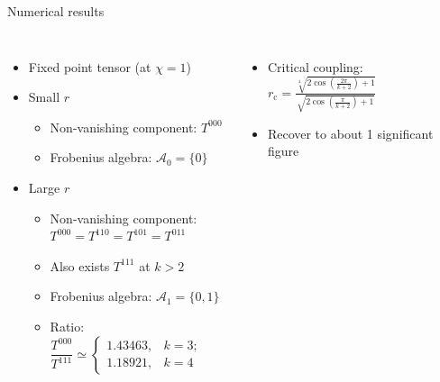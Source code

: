 \documentclass{fdubeamer}
\begin{document}
\begin{frame}{Numerical results}

\begin{columns}[T]


    \begin{itemize}
      \item Fixed point tensor (at $\chi=1$)
      \item Small $r$

        \begin{itemize}
          \item Non-vanishing component: $T^{000}$
          \item Frobenius algebra: $\mathcal{A}_0=\{0\}$
        \end{itemize}

      \item Large $r$

        \begin{itemize}
          \item Non-vanishing component: \\
            \mbox{\quad} $T^{000}=T^{110}=T^{101}=T^{011}$
          \item Also exists $T^{111}$ at $k>2$
          \item Frobenius algebra: $\mathcal{A}_1=\{0,1\}$
          \item Ratio:
            $
              \dfrac{T^{000}}{T^{111}} \simeq \begin{cases}
                1.43463, & k = 3; \\[-0.5ex]
                1.18921, & k = 4
              \end{cases}
            $
        \end{itemize}
    \end{itemize}


    \vspace{-0.85em}
    \begin{itemize}
      \item Critical coupling:
        $r_{\!\mathrm{c}} = \frac{\sqrt[4]{2\cos\left(\frac{2\pi}{k+2}\right) + 1}}{\sqrt{2\cos\left(\frac{\pi}{k+2}\right) + 1}}$
      \item Recover to about 1 significant figure
    \end{itemize}


\end{columns}
\end{frame}
\end{document}
